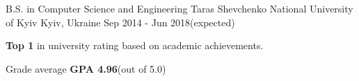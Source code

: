 

\begin{cventries}

  \cventry
    {B.S. in Computer Science and Engineering} %
    {Taras Shevchenko National University of Kyiv} %
    {Kyiv, Ukraine} %
    {Sep 2014 - Jun 2018(expected)} %
    {
      \begin{cvitems} %
        \item {\textbf{Top 1} in university rating based on academic achievements.}
        \item {Grade average \textbf{GPA 4.96}(out of 5.0)}
      \end{cvitems}
    }
\end{cventries}
